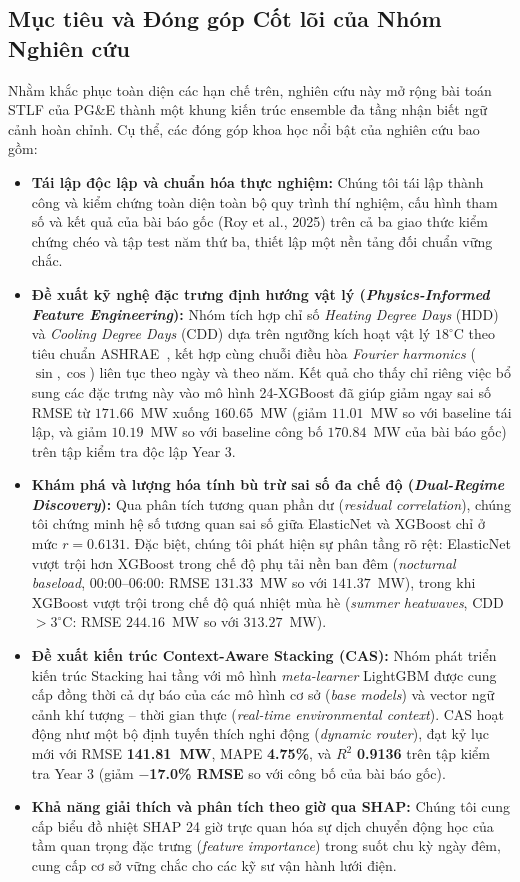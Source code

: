 \subsection{Mục tiêu và Đóng góp Cốt lõi của Nhóm Nghiên cứu}
Nhằm khắc phục toàn diện các hạn chế trên, nghiên cứu này mở rộng bài toán STLF của PG\&E thành một khung kiến trúc ensemble đa tầng nhận biết ngữ cảnh hoàn chỉnh. Cụ thể, các đóng góp khoa học nổi bật của nghiên cứu bao gồm:

\begin{itemize}
    \item \textbf{Tái lập độc lập và chuẩn hóa thực nghiệm:} Chúng tôi tái lập thành công và kiểm chứng toàn diện toàn bộ quy trình thí nghiệm, cấu hình tham số và kết quả của bài báo gốc (Roy et al., 2025) trên cả ba giao thức kiểm chứng chéo và tập test năm thứ ba, thiết lập một nền tảng đối chuẩn vững chắc.
    \item \textbf{Đề xuất kỹ nghệ đặc trưng định hướng vật lý (\textit{Physics-Informed Feature Engineering}):} Nhóm tích hợp chỉ số \textit{Heating Degree Days} (HDD) và \textit{Cooling Degree Days} (CDD) dựa trên ngưỡng kích hoạt vật lý $18^\circ\text{C}$ theo tiêu chuẩn ASHRAE~\cite{ashrae2021fundamentals}, kết hợp cùng chuỗi điều hòa \textit{Fourier harmonics} ($\sin, \cos$) liên tục theo ngày và theo năm. Kết quả cho thấy chỉ riêng việc bổ sung các đặc trưng này vào mô hình 24-XGBoost đã giúp giảm ngay sai số RMSE từ $171.66$~MW xuống $160.65$~MW (giảm $11.01$~MW so với baseline tái lập, và giảm $10.19$~MW so với baseline công bố $170.84$~MW của bài báo gốc) trên tập kiểm tra độc lập Year 3.
    \item \textbf{Khám phá và lượng hóa tính bù trừ sai số đa chế độ (\textit{Dual-Regime Discovery}):} Qua phân tích tương quan phần dư (\textit{residual correlation}), chúng tôi chứng minh hệ số tương quan sai số giữa ElasticNet và XGBoost chỉ ở mức $r = 0.6131$. Đặc biệt, chúng tôi phát hiện sự phân tầng rõ rệt: ElasticNet vượt trội hơn XGBoost trong chế độ phụ tải nền ban đêm (\textit{nocturnal baseload}, 00:00--06:00: RMSE $131.33$~MW so với $141.37$~MW), trong khi XGBoost vượt trội trong chế độ quá nhiệt mùa hè (\textit{summer heatwaves}, CDD $> 3^\circ\text{C}$: RMSE $244.16$~MW so với $313.27$~MW).
    \item \textbf{Đề xuất kiến trúc Context-Aware Stacking (CAS):} Nhóm phát triển kiến trúc Stacking hai tầng với mô hình \textit{meta-learner} LightGBM được cung cấp đồng thời cả dự báo của các mô hình cơ sở (\textit{base models}) và vector ngữ cảnh khí tượng -- thời gian thực (\textit{real-time environmental context}). CAS hoạt động như một bộ định tuyến thích nghi động (\textit{dynamic router}), đạt kỷ lục mới với RMSE \textbf{141.81~MW}, MAPE \textbf{4.75\%}, và $R^2$ \textbf{0.9136} trên tập kiểm tra Year 3 (giảm \textbf{$-$17.0\% RMSE} so với công bố của bài báo gốc).
    \item \textbf{Khả năng giải thích và phân tích theo giờ qua SHAP:} Chúng tôi cung cấp biểu đồ nhiệt SHAP 24 giờ trực quan hóa sự dịch chuyển động học của tầm quan trọng đặc trưng (\textit{feature importance}) trong suốt chu kỳ ngày đêm, cung cấp cơ sở vững chắc cho các kỹ sư vận hành lưới điện.
\end{itemize}
